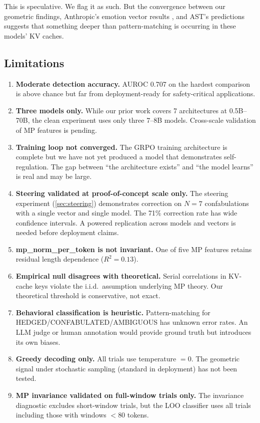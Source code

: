 This is speculative. We flag it as such. But the convergence between our
geometric findings, Anthropic's emotion vector results
\citep{anthropic2026emotions}, and AST's predictions suggests that
something deeper than pattern-matching is occurring in these models'
KV caches.

\subsection{Limitations}

\begin{enumerate}[nosep]
  \item \textbf{Moderate detection accuracy.} AUROC 0.707 on the hardest
    comparison is above chance but far from deployment-ready for
    safety-critical applications.
  \item \textbf{Three models only.} While our prior work covers 7
    architectures at 0.5B--70B, the clean experiment uses only three
    7--8B models. Cross-scale validation of MP features is pending.
  \item \textbf{Training loop not converged.} The GRPO training
    architecture is complete but we have not yet produced a model that
    demonstrates self-regulation. The gap between ``the architecture
    exists'' and ``the model learns'' is real and may be large.
  \item \textbf{Steering validated at proof-of-concept scale only.}
    The steering experiment (\cref{sec:steering}) demonstrates correction
    on $N = 7$ confabulations with a single vector and single model.
    The 71\% correction rate has wide confidence intervals. A powered
    replication across models and vectors is needed before deployment
    claims.
  \item \textbf{mp\_norm\_per\_token is not invariant.} One of five MP
    features retains residual length dependence ($R^2 = 0.13$).
  \item \textbf{Empirical null disagrees with theoretical.} Serial
    correlations in KV-cache keys violate the i.i.d.\ assumption
    underlying MP theory. Our theoretical threshold is conservative,
    not exact.
  \item \textbf{Behavioral classification is heuristic.} Pattern-matching
    for HEDGED/CONFABULATED/AMBIGUOUS has unknown error rates. An LLM
    judge or human annotation would provide ground truth but introduces
    its own biases.
  \item \textbf{Greedy decoding only.} All trials use temperature $= 0$.
    The geometric signal under stochastic sampling (standard in deployment)
    has not been tested.
  \item \textbf{MP invariance validated on full-window trials only.}
    The invariance diagnostic excludes short-window trials, but the LOO
    classifier uses all trials including those with windows $< 80$ tokens.
\end{enumerate}


